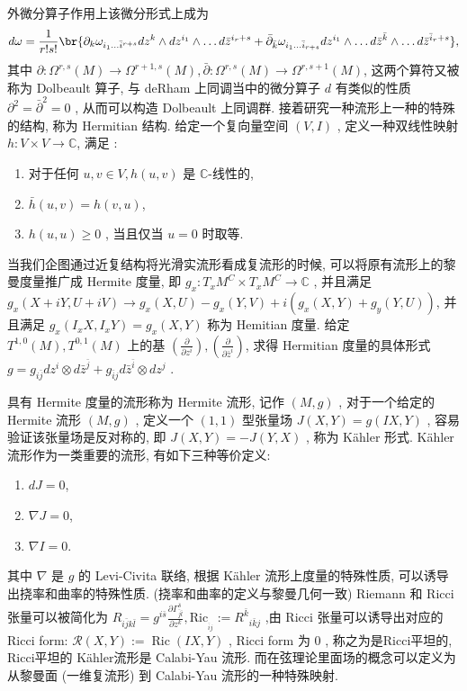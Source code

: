 \documentclass[UTF8,AutoFakeBold,scheme=chinese,eversion]{GXMU-Thesis}
\begin{document}
外微分算子作用上该微分形式上成为
\[d \omega=\frac{1}{r ! s !}\br{\partial_k \omega_{i_1 \ldots \bar{i}^{r+s}} d z^k \wedge d z^{i_1} \wedge \ldots d \bar{z}^{i_r+s}+\bar{\partial}_{\bar{k}} \omega_{i_1 \ldots \bar{i}_{r+s}} d z^{i_1} \wedge \ldots d \bar{z}^{\bar{k}} \wedge \ldots d \bar{z}^{\bar{i}_r+s} },\]
其中 $\partial: \Omega^{r, s}(M) \rightarrow \Omega^{r+1, s}(M) , \bar{\partial}: \Omega^{r, s}(M) \rightarrow \Omega^{r, s+1}(M)$, 这两个算符又被称为 Dolbeault 算子, 与 deRham 上同调当中的微分算子 $d$ 有类似的性质 $\partial^2=\bar{\partial}^2=0$ , 从而可以构造 Dolbeault 上同调群. 
接着研究一种流形上一种的特殊的结构, 称为 Hermitian 结构. 给定一个复向量空间 $(V, I)$ , 定义一种双线性映射 $h: V \times V \rightarrow \mathbb{C}$, 满足 :
\begin{enumerate}[label=(\roman*)]
    \item 对于任何 $u, v \in V, h(u, v)$ 是 $\mathbb{C}$-线性的,
    \item $\bar{h}(u, v)=h(v, u)$,
    \item $h(u, u) \geq 0$ , 当且仅当 $u=0$ 时取等.
\end{enumerate}
当我们企图通过近复结构将光滑实流形看成复流形的时候, 可以将原有流形上的黎曼度量推广成 Hermite 度量, 即 $g_x: T_x M^C \times T_x M^C \rightarrow \mathbb{C}$ , 并且满足
$g_x(X+i Y, U+i V) \rightarrow g_x(X, U)-g_x(Y, V)+i\left(g_x(X, Y)+g_y(Y, U)\right)$, 并且满足
$g_x\left(I_x X, I_x Y\right)=g_x(X, Y)$ 称为 Hemitian 度量. 给定 $T^{1,0}(M), T^{0,1}(M)$ 上的基 $\left(\frac{\partial}{\partial z^i}\right),\left(\frac{\partial}{\partial \bar{z}^i}\right)$, 求得 Hermitian 度量的具体形式 $g=g_{i \bar{j}} d z^i \otimes d \bar{z}^{\bar{j}}+g_{\bar{i} j} d \bar{z}^{\bar{i}} \otimes d z^j$ . 

具有 Hermite 度量的流形称为 Hermite 流形, 记作 $(M, g)$ , 对于一个给定的 Hermite 流形 $(M, g)$ , 定义一个 $(1,1)$ 型张量场 $J(X, Y)=g(I X, Y)$ , 容易验证该张量场是反对称的, 即 $J(X, Y)=-J(Y, X)$ , 称为 K\"ahler 形式. 
K\"ahler 流形作为一类重要的流形, 有如下三种等价定义:
\begin{enumerate}[label=(\roman*)]
    \item $d J=0$,
    \item $\nabla J=0$,
    \item $\nabla I=0$.
\end{enumerate}
其中 $\nabla$ 是 $g$ 的 Levi-Civita 联络, 根据 Kähler 流形上度量的特殊性质, 可以诱导出挠率和曲率的特殊性质.  (挠率和曲率的定义与黎曼几何一致) Riemann 和 Ricci 张量可以被简化为 $R_{i \bar{j} k \bar{l}}=g^{i \bar{s}} \frac{\partial \Gamma_{\bar{j} \bar{l}}^{\bar{s}}}{\partial z^k} , \textrm{Ric}_{_{\bar{i} j}}:=R^{\bar{k}}{ }_{i \bar{k} j}$ ,由 Ricci 张量可以诱导出对应的 Ricci form: $\mathscr{R}(X, Y):=\operatorname{Ric}(I X, Y)$ , Ricci form 为 0 , 称之为是Ricci平坦的, Ricci平坦的 K\"ahler流形是 Calabi-Yau 流形. 而在弦理论里面场的概念可以定义为从黎曼面 (一维复流形) 到 Calabi-Yau 流形的一种特殊映射. 
\end{document}
